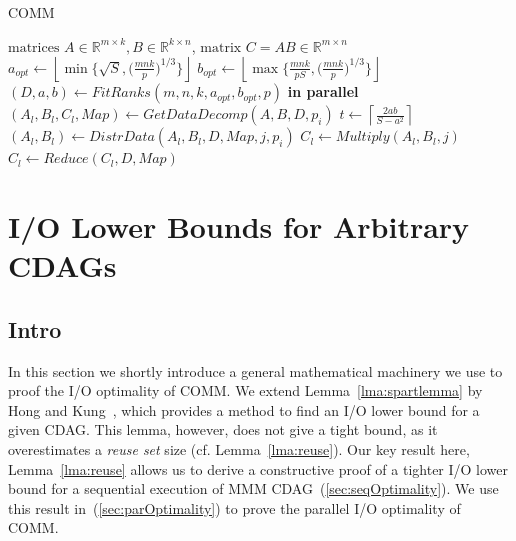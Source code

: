 \documentclass[sigplan,review,anonymous]{acmart}\settopmatter{printfolios=true,printccs=false,printacmref=false}
\begin{document}
\begin{algorithm}
	\small
\caption{COMM} \label{alg:comm}
\begin{algorithmic}[1]
\Require $\text{matrices } A \in \mathbb{R}^{m \times k}, B \in 
\mathbb{R}^{k \times n}$,
\Ensure $\text{matrix } C = AB \in \mathbb{R}^{m \times n}$
\State $a_{opt} \gets \left \lfloor \min\Big\{\sqrt{S}, 
\Big(\frac{mnk}{p}\Big)^{1/3} \Big\} \right \rfloor$ 
\label{alg:line:aopt}
\State $b_{opt} \gets \left \lfloor \max\Big\{\frac{mnk}{pS}, 
\Big(\frac{mnk}{p}\Big)^{1/3} \Big\} \right \rfloor$ 
\label{alg:line:bopt}
\State $(D, a, b) \gets FitRanks(m,n,k,a_{opt},b_{opt},p)$ 
\label{alg:line:fitranks}
 \textbf{in parallel}
\label{alg:line:outerloopStart}
%
\State $(A_l, B_l, C_l,Map) \gets GetDataDecomp(A,B, D, p_i)$ 
\label{alg:line:datadecomp}
\State $t \gets \left \lceil{\frac{2ab}{S - a^2}}\right \rceil$ 
\label{alg:line:steps}
\label{alg:line:innerloopStart}
\State $(A_l, B_l) \gets DistrData(A_l,B_l,D, Map, j, p_i)$ 
\label{alg:line:distrData}
\State $C_l \gets Multiply(A_l, B_l,j)$ 
\label{alg:line:compute}
\EndFor
\label{alg:line:innerLoopEnd}
\State $C_l \gets Reduce(C_l,D,  Map)$ 
\label{alg:line:reduce}
\EndFor
\label{alg:line:outerLoopEnd}
\end{algorithmic}
\end{algorithm}


\section{I/O Lower Bounds for Arbitrary CDAGs}
\subsection{Intro}
\label{sec:introIO}
In this section we shortly introduce a general mathematical machinery we use to 
proof 
the I/O optimality of COMM. We extend Lemma~\ref{lma:spartlemma} by 
Hong and 
Kung~\cite{redblue}, which provides a method to find an I/O lower bound for a 
given CDAG. This lemma, however, does not give a tight bound, as it 
overestimates a \emph{reuse set} size (cf. 
Lemma~\ref{lma:reuse}). Our key result here, Lemma~\ref{lma:reuse} 
allows us to derive a constructive proof of a tighter I/O lower bound for a 
sequential execution of MMM CDAG~(\cref{sec:seqOptimality}). We use this result 
in~(\cref{sec:parOptimality}) to prove the parallel I/O optimality of COMM.
\end{document}
